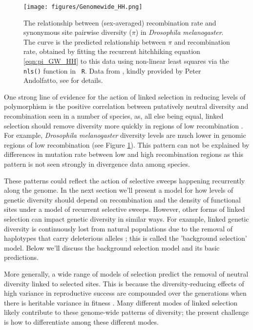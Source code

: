 \begin{figure}
\begin{center}
\texttt{[image: figures/Genomewide\_HH.png]}
\end{center}
\caption{The relationship between (sex-averaged) recombination rate and synonymous
  site pairwise diversity ($\pi$) in {\it Drosophila melanogaster}. The curve is the
  predicted relationship between $\pi$ and recombination rate, obtained
  by fitting the recurrent hitchhiking equation \eqref{eqn:pi_GW_HH} to this data 
 using non-linear least squares via the {\tt nls()} function in {\tt
   R}.  Data from \citep{Shapiro:07}, kindly provided by Peter
  Andolfatto, see \citet{sella2009pervasive} for details. } \label{fig:GW_hitchhiking_reduction}  %
\end{figure}

One strong line of evidence for the action of linked selection in reducing levels of
polymorphism is the positive correlation between putatively
neutral diversity and recombination seen in a number of species, as, all
else being equal, linked selection should remove diversity more quickly in regions of low recombination 
\citep{Aguade:89,Begun:92,Wiehe:93,Cutter:10,Cai:09}. For example, {\it Drosophila melanogaster} diversity
levels are much lower in genomic regions of low recombination (see
Figure \ref{fig:GW_hitchhiking_reduction}). This pattern can not be
explained by differences in mutation rate between low and high
recombination regions as this pattern is not seen strongly in
divergence data among species.

These patterns could reflect the action of selective sweeps happening
recurrently along the genome. In the next section we'll present a model for how levels of
genetic diversity should depend on recombination and the density of
functional sites under a model of recurrent selective sweeps.
However, other forms of linked selection can impact genetic
diversity in similar ways. For example, linked genetic diversity is
continuously lost from natural populations due to the removal of
haplotypes that carry deleterious alleles
\citep{Charlesworth:95,Hudson:95}; this is called the 'background selection'
model. Below we'll discuss the background selection model and its
basic predictions.

More generally, a wide range of models of selection predict the removal of neutral
diversity linked to selected sites. This is because the diversity-reducing effects of high variance in reproductive success are compounded over the generations when there is heritable variance in fitness 
\citep{Robertson:61,Santiago:95,Santiago:98,Barton:00}.  Many
different modes of linked selection likely contribute to these
genome-wide patterns of diversity; the present challenge is how to
differentiate among these different modes.


